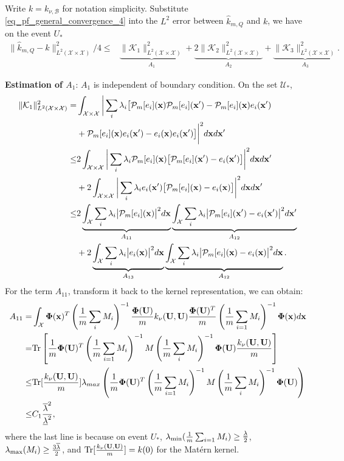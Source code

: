 \documentclass[aos,preprint]{imsart}
\theoremstyle{plain}
\newcommand{\CalX}{\mathcal X}
\newcommand{\CalP}{\mathcal P}
\newcommand{\CalU}{\mathcal U}
\newcommand{\CalK}{\mathcal K}
\newcommand{\Bx}{\bold x}
\newcommand{\BFx}{\bold x}
\newcommand{\BU}{\bold U}
\newcommand{\BPhi}{\boldsymbol{\Phi}}
\theoremstyle{remark}
\begin{document}
\begin{appendix}
Write $k=k_{\nu,\mathcal{B}}$ for notation simplicity. Substitute \eqref{eq_pf_general_convergence_4} into the $L^2$ error between $\hat{k}_{m,Q}$ and $k$, we have on the event $U_*$
\begin{align}
   \|\hat{k}_{m,Q}-k\|_{L^2(\CalX\times\CalX)}^2 /4 \leq& \underbrace{\|\CalK_1\|_{L^2(\CalX\times\CalX)}^2}_{A_1}+\underbrace{2\|\CalK_2\|_{L^2(\CalX\times\CalX)}^2}_{A_2}+\underbrace{\|\CalK_3\|_{L^2(\CalX\times\CalX)}^2}_{A_3} .\label{eq_pf_general_convergence_5}
\end{align}

{\large \textbf{Estimation of $A_1$}}: $A_1$ is independent of boundary condition. On the set $\CalU_*$,
\begin{align}
\|\CalK_1\|_{L^2(\CalX\times\CalX)}^2=&\int_{\CalX\times\CalX}\bigg|\sum_i\lambda_i\big[\CalP_m[e_i](\Bx)\CalP_m[e_i](\BFx')-\CalP_m[e_i](\Bx)e_i(\Bx')\nonumber\\
    &+\CalP_m[e_i](\Bx)e_i(\Bx')-e_i(\BFx)e_i(\BFx')\big]\bigg|^2d\BFx d\Bx'\nonumber\\
    \leq &2\int_{\CalX\times\CalX}\bigg|\sum_i\lambda_i\CalP_m[e_i](\Bx)\big[\CalP_m[e_i](\BFx')-e_i(\Bx')\big]\bigg|^2d\Bx d\Bx'\nonumber\\
    &+2\int_{\CalX\times\CalX}\bigg|\sum_i\lambda_ie_i(\Bx')\big[\CalP_m[e_i](\BFx)-e_i(\Bx)\big]\bigg|^2d\Bx d\Bx'\nonumber\\
    \leq &2\underbrace{\int_\CalX\sum_i\lambda_i\big|\CalP_m[e_i](\BFx)\big|^2d\BFx }_{A_{11}}\underbrace{\int_\CalX\sum_i\lambda_i\big|\CalP_m[e_i](\BFx')-e_i(\Bx')\big|^2d\BFx'}_{A_{12}}\nonumber\\
    &+2\underbrace{\int_\CalX\sum_i\lambda_i\big|e_i(\BFx)\big|^2d\BFx }_{A_{13}}\underbrace{\int_\CalX\sum_i\lambda_i\big|\CalP_m[e_i](\BFx)-e_i(\Bx)\big|^2d\BFx }_{A_{12}}.\label{eq_pf_general_convergence_6}
\end{align}
For the term $A_{11}$, transform it back to the kernel representation, we can obtain:
\begin{align*}
    A_{11}=&\int_\CalX \BPhi(\BFx)^T\left(\frac{1}{m}\sum_iM_i\right)^{-1}\frac{\BPhi(\BU)}{m}k_\nu(\BU,\BU)\frac{\BPhi(\BU)^T}{m}\left(\frac{1}{m}\sum_{i=1}M_i\right)^{-1}\BPhi(\Bx)d\BFx\\
    =&\text{Tr}\left[\frac{1}{m}{\BPhi(\BU)^T}\left(\frac{1}{m}\sum_{i=1}M_i\right)^{-1}M\left(\frac{1}{m}\sum_iM_i\right)^{-1}{\BPhi(\BU)}\frac{k_\nu(\BU,\BU)}{m}\right]\\
    \leq & \text{Tr}[\frac{k_\nu(\BU,\BU)}{m}]\lambda_{max}\left(\frac{1}{m}{\BPhi(\BU)^T}\left(\frac{1}{m}\sum_{i=1}M_i\right)^{-1}M\left(\frac{1}{m}\sum_iM_i\right)^{-1}{\BPhi(\BU)}\right)\\
    \leq & C_1 \frac{\overline{\lambda}^2}{\underline{\lambda}^2},
\end{align*}
where the last line is because on event $U_*$, $\lambda_{\rm min}(\frac{1}{m}\sum_{i=1}M_i)\geq \frac{\underline{\lambda}}{2}$,  $ \lambda_{\rm max}(M_i)\geq \frac{3\overline{\lambda}}{2}$, and $\text{Tr}[\frac{k_\nu(\BU,\BU)}{m}]=k(0)$ for the Mat\'ern kernel.


\end{appendix}
\end{document}
